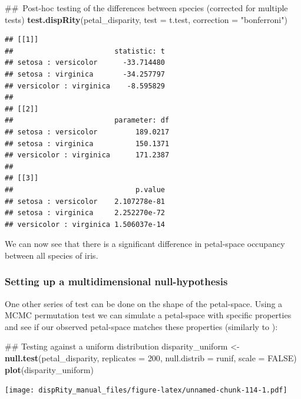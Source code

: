 \documentclass[]{book}
\newenvironment{Shaded}{\begin{snugshade}}{\end{snugshade}}
\newcommand{\KeywordTok}[1]{\textcolor[rgb]{0.13,0.29,0.53}{\textbf{#1}}}
\newcommand{\DataTypeTok}[1]{\textcolor[rgb]{0.13,0.29,0.53}{#1}}
\newcommand{\DecValTok}[1]{\textcolor[rgb]{0.00,0.00,0.81}{#1}}
\newcommand{\StringTok}[1]{\textcolor[rgb]{0.31,0.60,0.02}{#1}}
\newcommand{\OtherTok}[1]{\textcolor[rgb]{0.56,0.35,0.01}{#1}}
\newcommand{\NormalTok}[1]{#1}
\theoremstyle{definition}
\theoremstyle{definition}
\theoremstyle{remark}
\begin{document}
\begin{Shaded}
\begin{Highlighting}[]
\NormalTok{## Post-hoc testing of the differences between species (corrected for multiple tests)}
\KeywordTok{test.dispRity}\NormalTok{(petal_disparity, }\DataTypeTok{test =}\NormalTok{ t.test, }\DataTypeTok{correction =} \StringTok{"bonferroni"}\NormalTok{)}
\end{Highlighting}
\end{Shaded}

\begin{verbatim}
## [[1]]
##                        statistic: t
## setosa : versicolor      -33.714480
## setosa : virginica       -34.257797
## versicolor : virginica    -8.595829
## 
## [[2]]
##                        parameter: df
## setosa : versicolor         189.0217
## setosa : virginica          150.1371
## versicolor : virginica      171.2387
## 
## [[3]]
##                             p.value
## setosa : versicolor    2.107278e-81
## setosa : virginica     2.252270e-72
## versicolor : virginica 1.506037e-14
\end{verbatim}

We can now see that there is a significant difference in petal-space
occupancy between all species of iris.

\subsubsection{Setting up a multidimensional
null-hypothesis}\label{setting-up-a-multidimensional-null-hypothesis}

One other series of test can be done on the shape of the petal-space.
Using a MCMC permutation test we can simulate a petal-space with
specific properties and see if our observed petal-space matches these
properties (similarly to \citet{diaz2016global}):

\begin{Shaded}
\begin{Highlighting}[]
\NormalTok{## Testing against a uniform distribution}
\NormalTok{disparity_uniform <-}\StringTok{ }\KeywordTok{null.test}\NormalTok{(petal_disparity, }\DataTypeTok{replicates =} \DecValTok{200}\NormalTok{,}
    \DataTypeTok{null.distrib =}\NormalTok{ runif, }\DataTypeTok{scale =} \OtherTok{FALSE}\NormalTok{)}
\KeywordTok{plot}\NormalTok{(disparity_uniform)}
\end{Highlighting}
\end{Shaded}

\texttt{[image: dispRity\_manual\_files/figure-latex/unnamed-chunk-114-1.pdf]}
\end{document}
